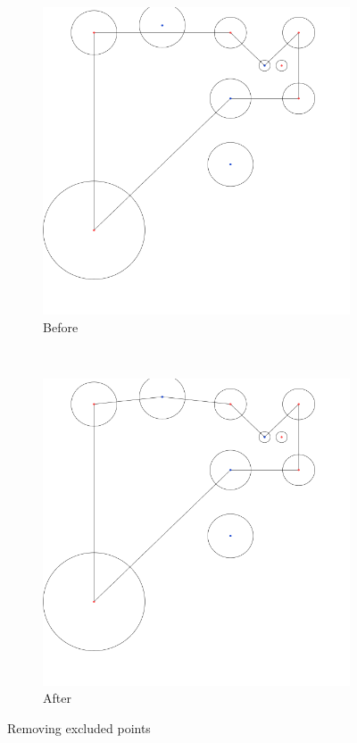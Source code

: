 \documentclass[paper=a4, fontsize=11pt]{scrartcl} %
\numberwithin{equation}{section} %
\numberwithin{figure}{section} %
\numberwithin{table}{section} %
\begin{document}
\begin{figure}[h]
        \centering
        \begin{subfigure}[b]{0.4\textwidth}
                \includegraphics[width=\textwidth]{radii}
                \caption{Before}
        \end{subfigure}%
        ~ %
        \begin{subfigure}[b]{0.4\textwidth}
                \includegraphics[width=\textwidth]{fixed_hull}
                \caption{After}
        \end{subfigure}
        \caption{Removing excluded points}\label{fig:fixed_hull}
\end{figure}
\end{document}
